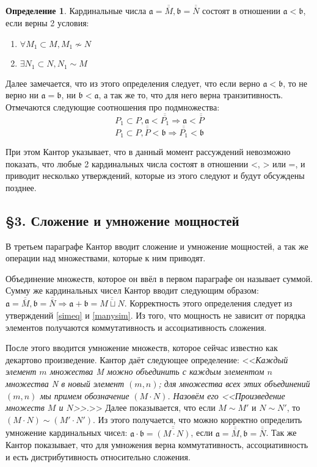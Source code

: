 \documentclass[a4paper,12pt]{extarticle}
\theoremstyle{definition}
\newtheorem{definition}{Определение}
\newcommand{\cit}[1]{<<\textit{#1}>>}
\newcommand{\car}[1]{\overline{\overline{#1}}}
\begin{document}
\begin{definition}
    \label{def-less}
    Кардинальные числа $\mathfrak{a} = \car{M}, \mathfrak{b} = \car{N}$ состоят в отношении $\mathfrak{a} < \mathfrak{b}$, если верны 2 условия:
    \begin{enumerate}
        \item $\forall M_1 \subset M, M_1 \nsim N$
        \item $\exists N_1 \subset N, N_1 \sim M$
    \end{enumerate}
\end{definition}
Далее замечается, что из этого определения следует, что если верно $\mathfrak{a} < \mathfrak{b}$, то не верно ни $\mathfrak{a} = \mathfrak{b}$, ни $\mathfrak{b} < \mathfrak{a}$,
а так же то, что для него верна транзитивность.
Отмечаются следующие соотношения про подмножества:
$$
P_1 \subset P, \mathfrak{a} < \car{P_1} \Rightarrow \mathfrak{a} < \car{P}
$$
$$
P_1 \subset P, \car{P} < \mathfrak{b} \Rightarrow \car{P_1} < \mathfrak{b}
$$

При этом Кантор указывает, что в данный момент рассуждений невозможно показать, что любые 2 кардинальных числа состоят в отношении <, > или =,
и приводит несколько утверждений, которые из этого следуют и будут обсуждены позднее.

\subsection{\S 3. Сложение и умножение мощностей}
В третьем параграфе Кантор вводит сложение и умножение мощностей, а так же операции над множествами, которые к ним приводят.

Объединение множеств, которое он ввёл в первом параграфе он называет суммой.
Сумму же кардинальных чисел Кантор вводит следующим образом: $\mathfrak{a} = \car{M}, \mathfrak{b} = \car{N} \Rightarrow \mathfrak{a + b} = \car{M \sqcup N}$.
Корректность этого определения следует из утверждений \ref{simeq} и \ref{manysim}.
Из того, что мощность не зависит от порядка элементов получаются коммутативность и ассоциативность сложения.

После этого вводится умножение множеств, которое сейчас известно как декартово произведение.
Кантор даёт следующее определение: \cit{Каждый элемент $m$ множества M можно объединить с каждым элементом $n$ множества N в новый элемент $(m, n)$;
для множества всех этих объединений $(m, n)$ мы примем обозначение $(M \cdot N)$. Назовём его <<\textnormal{Произведение множеств $M$ и $N$}>>.}
Далее показывается, что если $M \sim M'$ и $N \sim N'$, то $(M \cdot N) \sim (M' \cdot N')$.
Из этого получается, что можно корректно определить умножение кардинальных чисел: $\mathfrak{a \cdot b} = \car{(M \cdot N)}$, если $\mathfrak{a} = \car{M}, \mathfrak{b} = \car{N}$.
Так же Кантор показывает, что для умножения верна коммутативность, ассоциативность и есть дистрибутивность относительно сложения.
\end{document}
